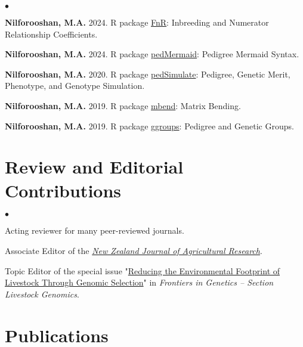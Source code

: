 \documentclass[margin,line]{res}
\newenvironment{list2}{
  \begin{list}{$\bullet$}{%
      \setlength{\itemsep}{0in}
      \setlength{\parsep}{0in} \setlength{\parskip}{0in}
      \setlength{\topsep}{0in} \setlength{\partopsep}{0in}
      \setlength{\leftmargin}{0.2in}}}{\end{list}}
\begin{document}
\begin{resume}
  \begin{list2}
    \item {\bf Nilforooshan, M.A.} 2024. R package \href{https://CRAN.R-project.org/package=FnR}{FnR}: Inbreeding and Numerator Relationship Coefficients. \\
    \item {\bf Nilforooshan, M.A.} 2024. R package \href{https://CRAN.R-project.org/package=pedMermaid}{pedMermaid}: Pedigree Mermaid Syntax. \\
    \item {\bf Nilforooshan, M.A.} 2020. R package \href{https://CRAN.R-project.org/package=pedSimulate}{pedSimulate}: Pedigree, Genetic Merit, Phenotype, and Genotype Simulation. \\
    \item {\bf Nilforooshan, M.A.} 2019. R package \href{https://CRAN.R-project.org/package=mbend}{mbend}: Matrix Bending. \\
    \item {\bf Nilforooshan, M.A.} 2019. R package \href{https://CRAN.R-project.org/package=ggroups}{ggroups}: Pedigree and Genetic Groups.
  \end{list2}
  \section{\sc Review and Editorial Contributions}

  \begin{list2}
    \item Acting reviewer for many peer-reviewed journals.
    \item Associate Editor of the \textit{\href{https://www.tandfonline.com/journals/tnza20}{New Zealand Journal of Agricultural Research}}.
    \item Topic Editor of the special issue "\href{https://www.frontiersin.org/research-topics/24065/reducing-the-environmental-footprint-of-livestock-through-genomic-selection}{Reducing the Environmental Footprint of Livestock Through Genomic Selection}" in \textit{Frontiers in Genetics -- Section Livestock Genomics}.
  \end{list2}
  \section{\sc Publications}
  

\end{resume}
\end{document}
